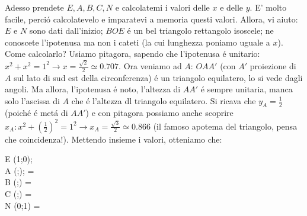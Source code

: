 Adesso prendete $E,A,B,C,N$ e calcolatemi i valori delle $x$ e delle $y$. E' molto facile, perci\'o calcolatevelo e imparatevi a memoria questi valori.
Allora, vi aiuto: $E$ e $N$ sono dati dall'inizio; $BOE$ \'e un bel triangolo rettangolo isoscele; ne conoscete l'ipotenusa ma non i cateti (la cui
lunghezza poniamo uguale a $x$). Come calcolarlo? Usiamo pitagora, sapendo che l'ipotenusa \'e unitario: 
$x^2+x^2=1^2 \longrightarrow x=\frac{\sqrt{2}}{2}\simeq 0.707$. Ora veniamo ad $A$: $OAA'$ (con $A'$ proiezione di $A$ sul lato di sud est
della circonferenza) \'e un triangolo equilatero, lo si vede dagli angoli. Ma allora, l'ipotenusa \'e noto, l'altezza di $AA'$ \'e sempre unitaria,
manca solo l'ascissa di $A$ che \'e l'altezza dl triangolo equilatero. Si ricava che $y_A=\frac{1}{2}$ (poich\'e \'e met\'a di $AA'$) e con pitagora
possiamo anche scoprire $x_A: x^2+(\frac{1}{2})^2=1^2 \longrightarrow x_A=\frac{\sqrt{3}}{2} \simeq 0.866$ (il famoso apotema del triangolo, pensa che
coincidenza!). Mettendo insieme i valori, otteniamo che:

\begin{equazione}
	E \equiv (1;0);  \\
	A \equiv (;); \theta= \\
	B \equiv (;) 			\theta= \\
	C \equiv (;) \theta= \\
	N \equiv (0;1) \theta= \\
\end{equazione}

